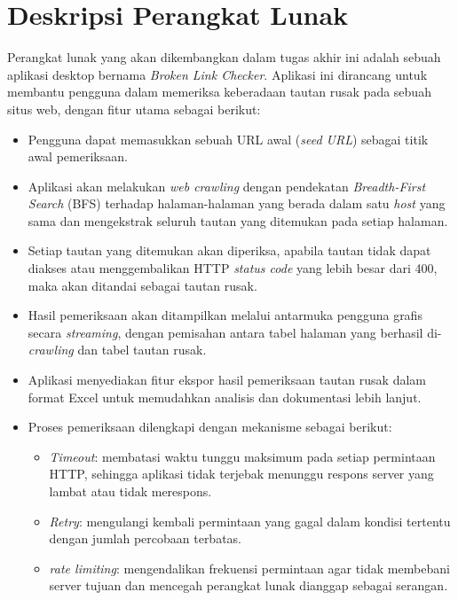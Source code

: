 \documentclass[a4paper,twoside]{article}
\begin{document}
\section{Deskripsi Perangkat Lunak}
Perangkat lunak yang akan dikembangkan dalam tugas akhir ini adalah sebuah aplikasi desktop bernama \textit{Broken Link Checker}. Aplikasi ini dirancang untuk membantu pengguna dalam memeriksa keberadaan tautan rusak pada sebuah situs web, dengan fitur utama sebagai berikut:

\begin{itemize}
    
    \item Pengguna dapat memasukkan sebuah URL awal (\textit{seed URL}) sebagai titik awal pemeriksaan.
    
    \item Aplikasi akan melakukan \textit{web crawling} dengan pendekatan \textit{Breadth-First Search} (BFS) terhadap halaman-halaman yang berada dalam satu \textit{host} yang sama dan mengekstrak seluruh tautan yang ditemukan pada setiap halaman.
    
    \item Setiap tautan yang ditemukan akan diperiksa, apabila tautan tidak dapat diakses atau menggembalikan HTTP \textit{status code} yang lebih besar dari 400, maka akan ditandai sebagai tautan rusak.
    
    \item Hasil pemeriksaan akan ditampilkan melalui antarmuka pengguna grafis secara \textit{streaming}, dengan pemisahan antara tabel halaman yang berhasil di-\textit{crawling} dan tabel tautan rusak.
    
    \item Aplikasi menyediakan fitur ekspor hasil pemeriksaan tautan rusak dalam format Excel untuk memudahkan analisis dan dokumentasi lebih lanjut.
    
    \item Proses pemeriksaan dilengkapi dengan mekanisme sebagai berikut:
    \begin{itemize}
        
        \item \textit{Timeout}: membatasi waktu tunggu maksimum pada setiap permintaan HTTP, sehingga aplikasi tidak terjebak menunggu respons server yang lambat atau tidak merespons.
        
        \item \textit{Retry}: mengulangi kembali permintaan yang gagal dalam kondisi tertentu dengan jumlah percobaan terbatas.
        
        \item \textit{rate limiting}: mengendalikan frekuensi permintaan agar tidak membebani server tujuan dan mencegah perangkat lunak dianggap sebagai serangan.
    \end{itemize}
\end{itemize}
\end{document}

